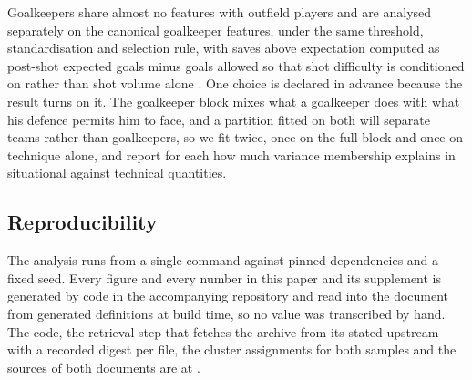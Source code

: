 Goalkeepers share almost no features with outfield players and are analysed separately on the
\KeeperFeatureCountArchive{} canonical goalkeeper features, under the same threshold,
standardisation and selection rule, with saves above expectation computed as post-shot expected
goals minus goals allowed so that shot difficulty is conditioned on rather than shot volume
alone \citep{vatvani2022upgrading}. One choice is declared in advance because the result turns
on it. The goalkeeper block mixes what a goalkeeper does with what his defence permits him to
face, and a partition fitted on both will separate teams rather than goalkeepers, so we fit
twice, once on the full block and once on technique alone, and report for each how much variance
membership explains in situational against technical quantities.

\subsection{Reproducibility}

The analysis runs from a single command against pinned dependencies and a fixed seed. Every
figure and every number in this paper and its supplement is generated by code in the
accompanying repository and read into the document from generated definitions at build time, so
no value was transcribed by hand. The code, the retrieval step that fetches the archive from its
stated upstream with a recorded digest per file, the cluster assignments for both samples and
the sources of both documents are at
\repourl{}.
